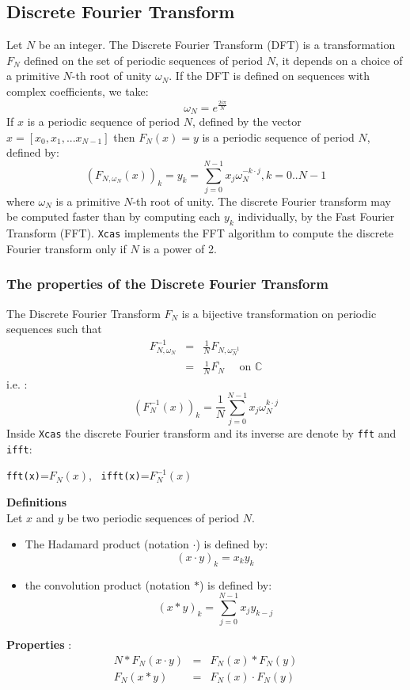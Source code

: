 \documentclass[a4paper,11pt]{book}
\begin{document}
\subsection{Discrete Fourier Transform}
Let $N$ be an integer.
The Discrete Fourier Transform (DFT) is a transformation $F_N$ defined on
the set of periodic sequences of period $N$, it depends on a choice
of a primitive $N$-th root of unity $\omega_N$. If the
DFT is defined on sequences with complex coefficients, we take:
\[ \omega_N=e^{\frac{2 i \pi}{N}}\]
If $x$ is a periodic sequence of period 
$N$, defined by the vector $x=[x_0,x_1,...x_{N-1}]$ then 
$F_N(x)=y$ is a periodic sequence of period $N$, defined by:
\[ {(F_{N,\omega_N}(x))}_k=y_k=\sum_{j=0}^{N-1}x_j\omega_N^{-k\cdot j}, k=0..N-1 \]
where $\omega_N$ is a primitive $N$-th root of unity. 
The discrete Fourier transform may be computed faster than by
computing each $y_k$ individually, by the Fast Fourier Transform (FFT).
{\tt Xcas} implements the FFT algorithm to compute
the discrete Fourier transform only if $N$ is a power of 2.

\subsubsection{The properties of the Discrete Fourier Transform}
The Discrete Fourier Transform $F_N$ is a bijective transformation 
on periodic sequences such that 
\begin{eqnarray*}
 F_{N,\omega_N}^{-1}&=&\frac{1}{N} F_{N,\omega_N^{-1}} \\
&=&\frac{1}{N} \overline{F_{N}} \quad \mbox{ on } \mathbb C
\end{eqnarray*}
i.e. :
\[ {(F_N^{-1}(x))}_k=\frac{1}{N}\sum_{j=0}^{N-1}x_j\omega_N^{k\cdot j} \]
Inside {\tt Xcas} the discrete Fourier transform and its inverse
are denote by {\tt fft} and  {\tt ifft}:
\begin{center}
{\tt fft(x)}=$\displaystyle F_N(x)$, \ {\tt ifft(x)}=$\displaystyle F_N^{-1}(x)$
\end{center}
{\bf Definitions}\\
Let $x$ and  $y$ be two periodic sequences of period $N$.
\begin{itemize}
\item The Hadamard product (notation $\cdot$) is defined by:
\[ {(x \cdot y)}_k = x_k y_k \]
\item the convolution product (notation $*$) is defined by:
\[ {(x * y)}_k=\sum_{j=0}^{N-1}x_jy_{k-j} \]
\end{itemize}
{\bf Properties} :
\begin{eqnarray*}
N*F_N(x \cdot y)&=&F_N(x) * F_N(y)\\
F_N(x * y)&=&F_N(x) \cdot F_N(y)
\end{eqnarray*}
\end{document}
